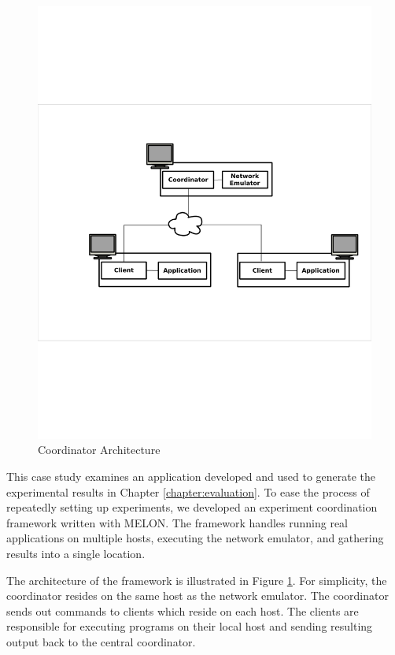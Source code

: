 \begin{figure}
\centering
\includegraphics[scale = .75, clip, trim = 94px 279px 24px 252px]{figures/experiment_arch.pdf}
\caption{Coordinator Architecture}
\label{fig:coordarchitecture}
\end{figure}

This case study examines an application developed and used to generate the experimental results in Chapter \ref{chapter:evaluation}. To ease the process of repeatedly setting up experiments, we developed an experiment coordination framework written with MELON. The framework handles running real applications on multiple hosts, executing the network emulator, and gathering results into a single location.

The architecture of the framework is illustrated in Figure \ref{fig:coordarchitecture}. For simplicity, the coordinator resides on the same host as the network emulator. The coordinator sends out commands to clients which reside on each host. The clients are responsible for executing programs on their local host and sending resulting output back to the central coordinator.

